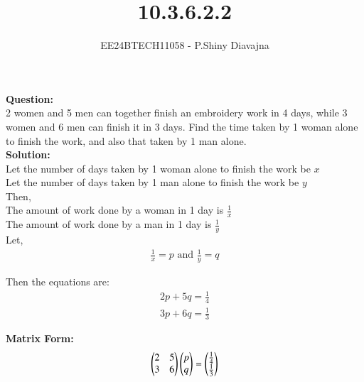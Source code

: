 \documentclass[journal]{IEEEtran}
\begin{document}

\vspace{3cm}

\title{10.3.6.2.2}
\author{EE24BTECH11058 - P.Shiny Diavajna}
{\let\newpage\relax\maketitle}

\renewcommand{\thefigure}{\theenumi}
\renewcommand{\thetable}{\theenumi}
\setlength{\intextsep}{10pt} %


\renewcommand{\thetable}{\theenumi}
\textbf{Question:}\\
2 women and 5 men can together finish an embroidery work in 4 days, while 3 women and 6 men can finish it in 3 days. Find the time taken by 1 woman alone to finish the work, and also that taken by 1 man alone.\\

\textbf{Solution:}\\
Let the number of days taken by 1 woman alone to finish the work be $x$\\
Let the number of days taken by 1 man alone to finish the work be $y$\\

Then,\\
The amount of work done by a woman in 1 day is $\frac{1}{x}$\\
The amount of work done by a man in 1 day is $\frac{1}{y}$\\

Let,
\begin{align}
   \frac{1}{x} =p \text{ and } \frac{1}{y}=q
\end{align}

Then the equations are:
\begin{align}
    2p+5q=\frac{1}{4}\\
    3p+6q=\frac{1}{3}
\end{align}

\textbf{Matrix Form:}
\begin{align}
   \begin{pmatrix}2 & 5 \\ 3 &6\end{pmatrix}\begin{pmatrix}p\\q\end{pmatrix}= \begin{pmatrix}\frac{1}{4}\\\frac{1}{3}\end{pmatrix}
\end{align}\\
\end{document}
